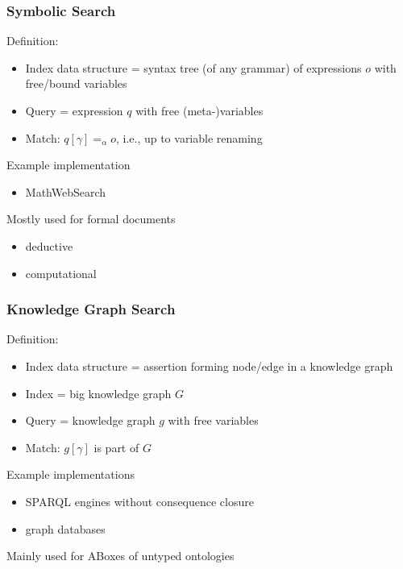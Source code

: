 \begin{frame}\frametitle{Symbolic Search}
Definition:
\begin{itemize}
\item Index data structure = syntax tree (of any grammar) of expressions $o$ with free/bound variables
\item Query = expression $q$ with free (meta-)variables
\item Match: $q[\gamma]=_\alpha o$, i.e., up to variable renaming
\end{itemize}

Example implementation
 \begin{itemize}
 \item MathWebSearch 
 \end{itemize}

Mostly used for formal documents
\begin{itemize}
 \item deductive
 \item computational
\end{itemize}
\end{frame}

\begin{frame}\frametitle{Knowledge Graph Search}
Definition:
\begin{itemize}
\item Index data structure = assertion forming node/edge in a knowledge graph
\item Index = big knowledge graph $G$
\item Query = knowledge graph $g$ with free variables
\item Match: $g[\gamma]$ is part of $G$
\end{itemize}

Example implementations
 \begin{itemize}
 \item SPARQL engines without consequence closure 
 \item graph databases
 \end{itemize}

Mainly used for ABoxes of untyped ontologies
\end{frame}

